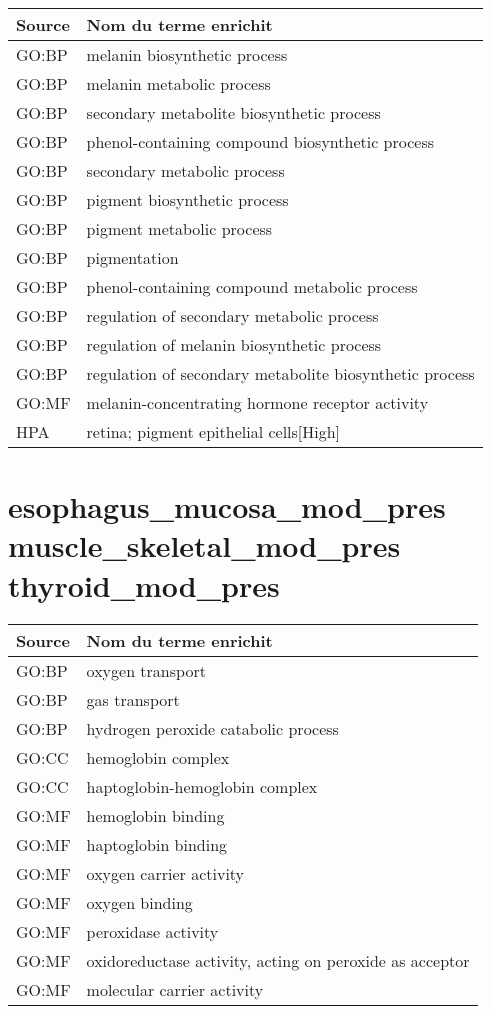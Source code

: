 \begin{longtable}{ll}
\toprule
Source & Nom du terme enrichit\\
\midrule
GO:BP & melanin biosynthetic process\\
GO:BP & melanin metabolic process\\
GO:BP & secondary metabolite biosynthetic process\\
GO:BP & phenol-containing compound biosynthetic process\\
GO:BP & secondary metabolic process\\
GO:BP & pigment biosynthetic process\\
GO:BP & pigment metabolic process\\
GO:BP & pigmentation\\
GO:BP & phenol-containing compound metabolic process\\
GO:BP & regulation of secondary metabolic process\\
GO:BP & regulation of melanin biosynthetic process\\
GO:BP & regulation of secondary metabolite biosynthetic process\\
GO:MF & melanin-concentrating hormone receptor activity\\
HPA & retina; pigment epithelial cells[High]\\
\bottomrule
\end{longtable}

\section*{esophagus\_mucosa\_mod\_pres \newline muscle\_skeletal\_mod\_pres \newline thyroid\_mod\_pres}

\begin{longtable}{ll}
\toprule
Source & Nom du terme enrichit\\
\midrule
GO:BP & oxygen transport\\
GO:BP & gas transport\\
GO:BP & hydrogen peroxide catabolic process\\
GO:CC & hemoglobin complex\\
GO:CC & haptoglobin-hemoglobin complex\\
GO:MF & hemoglobin binding\\
GO:MF & haptoglobin binding\\
GO:MF & oxygen carrier activity\\
GO:MF & oxygen binding\\
GO:MF & peroxidase activity\\
GO:MF & oxidoreductase activity, acting on peroxide as acceptor\\
GO:MF & molecular carrier activity\\
\bottomrule
\end{longtable}

